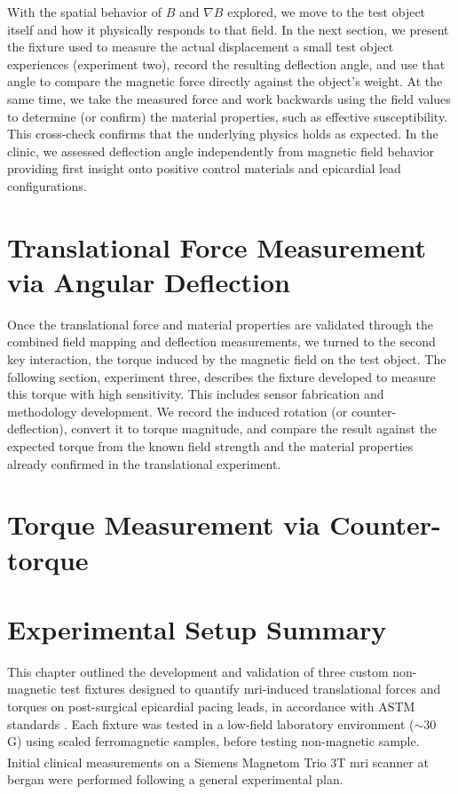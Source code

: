 With the spatial behavior of $B$ and $\nabla B$ explored, we move to the test object itself and how it physically responds to that field. In the next section, we present the fixture used to measure the actual displacement a small test object experiences (experiment two), record the resulting deflection angle, and use that angle to compare the magnetic force directly against the object's weight. At the same time, we take the measured force and work backwards using the field values to determine (or confirm) the material properties, such as effective susceptibility. This cross-check confirms that the underlying physics holds as expected. In the clinic, we assessed deflection angle independently from magnetic field behavior providing first insight onto positive control materials and epicardial lead configurations.

\section{Translational Force Measurement via Angular Deflection}
\label{sec:Translational}


Once the translational force and material properties are validated through the combined field mapping and deflection measurements, we turned to the second key interaction, the torque induced by the magnetic field on the test object.
The following section, experiment three, describes the fixture developed to measure this torque with high sensitivity. This includes sensor fabrication and methodology development. We record the induced rotation (or counter-deflection), convert it to torque magnitude, and compare the result against the expected torque from the known field strength and the material properties already confirmed in the translational experiment. 

\section{Torque Measurement via Counter-torque}
\label{sec:metsTorque}



\section{Experimental Setup Summary}

This chapter outlined the development and validation of three custom non-magnetic test fixtures designed to quantify \gls{mri}-induced translational forces and torques on post-surgical epicardial pacing leads, in accordance with ASTM standards \cite{astmF2052,astm2213,astmF2182,ASTM_F2503_2023}. Each fixture was tested in a low-field laboratory environment ($\sim$30 G) using scaled ferromagnetic samples, before testing non-magnetic sample. Initial clinical measurements on a Siemens Magnetom Trio\textsuperscript{\texttrademark} 3T \gls{mri} scanner at \gls{bergan} were performed following a general experimental plan.

